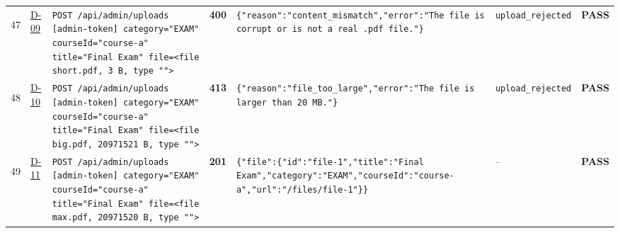 \documentclass[10pt,a4paper]{article}
\begin{document}
\begin{landscape}
\begin{longtable}{@{}P{0.6cm}P{0.9cm}P{8.5cm}P{1.0cm}P{6.2cm}P{4.2cm}P{1.1cm}@{}}
\hypertarget{call47}{47} & \hyperlink{test-D-09}{D-09} & \texttt{POST /\allowbreak{}api/\allowbreak{}admin/\allowbreak{}uploads [admin-\allowbreak{}token] category=\allowbreak{}"\allowbreak{}EXAM"\allowbreak{} courseId=\allowbreak{}"\allowbreak{}course-\allowbreak{}a"\allowbreak{} title=\allowbreak{}"\allowbreak{}Final Exam"\allowbreak{} file=\allowbreak{}<file short.\allowbreak{}pdf,\allowbreak{} 3 B,\allowbreak{} type "\allowbreak{}"\allowbreak{}>} & \textcolor{warnamber}{\textbf{400}} & \texttt{\{"\allowbreak{}reason"\allowbreak{}:\allowbreak{}"\allowbreak{}content\_\allowbreak{}mismatch"\allowbreak{},\allowbreak{}"\allowbreak{}error"\allowbreak{}:\allowbreak{}"\allowbreak{}The file is corrupt or is not a real .\allowbreak{}pdf file.\allowbreak{}"\allowbreak{}\}} & \texttt{upload\_\allowbreak{}rejected} & \textcolor{passgreen}{\textbf{PASS}} \\
\hypertarget{call48}{48} & \hyperlink{test-D-10}{D-10} & \texttt{POST /\allowbreak{}api/\allowbreak{}admin/\allowbreak{}uploads [admin-\allowbreak{}token] category=\allowbreak{}"\allowbreak{}EXAM"\allowbreak{} courseId=\allowbreak{}"\allowbreak{}course-\allowbreak{}a"\allowbreak{} title=\allowbreak{}"\allowbreak{}Final Exam"\allowbreak{} file=\allowbreak{}<file big.\allowbreak{}pdf,\allowbreak{} 20971521 B,\allowbreak{} type "\allowbreak{}"\allowbreak{}>} & \textcolor{warnamber}{\textbf{413}} & \texttt{\{"\allowbreak{}reason"\allowbreak{}:\allowbreak{}"\allowbreak{}file\_\allowbreak{}too\_\allowbreak{}large"\allowbreak{},\allowbreak{}"\allowbreak{}error"\allowbreak{}:\allowbreak{}"\allowbreak{}The file is larger than 20 MB.\allowbreak{}"\allowbreak{}\}} & \texttt{upload\_\allowbreak{}rejected} & \textcolor{passgreen}{\textbf{PASS}} \\
\hypertarget{call49}{49} & \hyperlink{test-D-11}{D-11} & \texttt{POST /\allowbreak{}api/\allowbreak{}admin/\allowbreak{}uploads [admin-\allowbreak{}token] category=\allowbreak{}"\allowbreak{}EXAM"\allowbreak{} courseId=\allowbreak{}"\allowbreak{}course-\allowbreak{}a"\allowbreak{} title=\allowbreak{}"\allowbreak{}Final Exam"\allowbreak{} file=\allowbreak{}<file max.\allowbreak{}pdf,\allowbreak{} 20971520 B,\allowbreak{} type "\allowbreak{}"\allowbreak{}>} & \textcolor{passgreen}{\textbf{201}} & \texttt{\{"\allowbreak{}file"\allowbreak{}:\allowbreak{}\{"\allowbreak{}id"\allowbreak{}:\allowbreak{}"\allowbreak{}file-\allowbreak{}1"\allowbreak{},\allowbreak{}"\allowbreak{}title"\allowbreak{}:\allowbreak{}"\allowbreak{}Final Exam"\allowbreak{},\allowbreak{}"\allowbreak{}category"\allowbreak{}:\allowbreak{}"\allowbreak{}EXAM"\allowbreak{},\allowbreak{}"\allowbreak{}courseId"\allowbreak{}:\allowbreak{}"\allowbreak{}course-\allowbreak{}a"\allowbreak{},\allowbreak{}"\allowbreak{}url"\allowbreak{}:\allowbreak{}"\allowbreak{}/\allowbreak{}files/\allowbreak{}file-\allowbreak{}1"\allowbreak{}\}\}} & -- & \textcolor{passgreen}{\textbf{PASS}} \\

\end{longtable}
\end{landscape}
\end{document}
